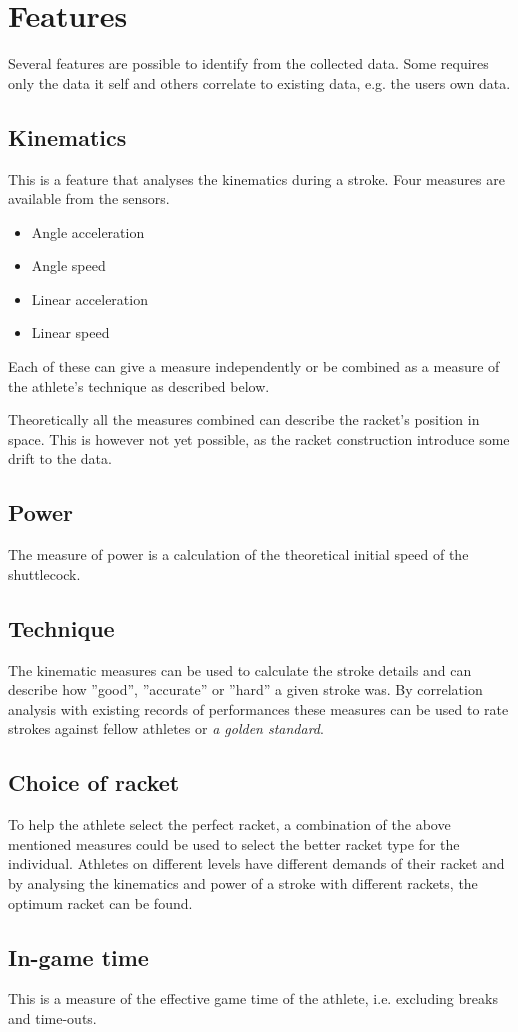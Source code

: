 
\section{Features}
Several features are possible to identify from the collected data.
Some requires only the data it self and others correlate to existing data, e.g. the users own data.

\subsection*{Kinematics}
This is a feature that analyses the kinematics during a stroke.
Four measures are available from the sensors.

\begin{itemize}
    \item Angle acceleration
    \item Angle speed
    \item Linear acceleration
    \item Linear speed
\end{itemize}

Each of these can give a measure independently or be combined as a measure of the athlete's technique as described below.

Theoretically all the measures combined can describe the racket's position in space.
This is however not yet possible, as the racket construction introduce some drift to the data.

\subsection*{Power}
The measure of power is a calculation of the theoretical initial speed of the shuttlecock.

\subsection*{Technique}
The kinematic measures can be used to calculate the stroke details and can describe how ''good'', ''accurate'' or ''hard'' a given stroke was.
By correlation analysis with existing records of performances these measures can be used to rate strokes against fellow athletes or \textit{a golden standard}.

\subsection*{Choice of racket}
To help the athlete select the perfect racket, a combination of the above mentioned measures could be used to select the better racket type for the individual.
Athletes on different levels have different demands of their racket and by analysing the kinematics and power of a stroke with different rackets, the optimum racket can be found.

\subsection*{In-game time}
This is a measure of the effective game time of the athlete, i.e. excluding breaks and time-outs.
